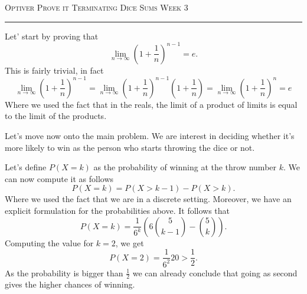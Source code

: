 \documentclass[12pt]{amsart}
\begin{document}
\thispagestyle{empty}

{\scshape Optiver Prove it} \hfill {\scshape \large Terminating Dice Sums} \hfill {\scshape Week 3}

\smallskip

\hrule

\bigskip
Let' start by proving that
\begin{equation}
    \lim_{n \to \infty} \left(1 +\frac{1}{n}\right)^{n-1} = e.
\end{equation}
This is fairly trivial, in fact
\begin{equation}
    \lim_{n \to \infty} \left(1 +\frac{1}{n}\right)^{n-1} = \lim_{n \to \infty} \left(1 +\frac{1}{n}\right)^{n-1} \left( 1+\frac{1}{n} \right)  =\lim_{n \to \infty}  \left(1 +\frac{1}{n}\right)^{n} = e
\end{equation}
Where we used the fact that in the reals, the limit of a product of limits is equal to the limit of the products.


Let's move now onto the main problem. We are interest in deciding whether it's more likely to win as the person who starts throwing the dice or not.

Let's define \(P(X=k)\) as the probability of winning at the throw number \(k\).
We can now compute it as follows
\begin{equation}
    P(X = k) = P(X>k-1) - P(X>k).
\end{equation}
Where we used the fact that we are in a discrete setting.
Moreover, we have an explicit formulation for the probabilities above. It follows
that
\begin{equation}
    P(X=k) = \frac{1}{6^k }\left( 6 {5 \choose k-1} - {5 \choose k} \right).
\end{equation}
Computing the value for \(k=2\), we get
\begin{equation}
    P(X=2)=\frac{1}{6^2}20 >\frac{1}{2}.
\end{equation}
As the probability is bigger than \(\frac{1}{2}\) we can already conclude that going as second gives the higher chances of winning.
\end{document}

